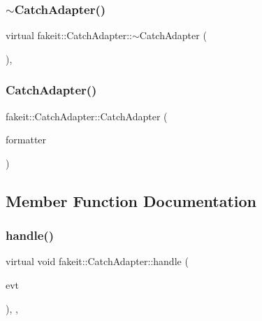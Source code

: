 \subsubsection{\texorpdfstring{$\sim$CatchAdapter()}{~CatchAdapter()}\hspace{0.1cm}{\footnotesize\ttfamily [2/2]}}
{\footnotesize\ttfamily virtual fakeit\+::\+Catch\+Adapter\+::$\sim$\+Catch\+Adapter (\begin{DoxyParamCaption}{ }\end{DoxyParamCaption})\hspace{0.3cm}{\ttfamily [virtual]}, {\ttfamily [default]}}

\mbox{\label{classfakeit_1_1CatchAdapter_acb482ad797e56b07cc0e019d1db0c323}} 
\subsubsection{\texorpdfstring{CatchAdapter()}{CatchAdapter()}\hspace{0.1cm}{\footnotesize\ttfamily [2/2]}}
{\footnotesize\ttfamily fakeit\+::\+Catch\+Adapter\+::\+Catch\+Adapter (\begin{DoxyParamCaption}\item[{\mbox{\hyperlink{structfakeit_1_1EventFormatter}{Event\+Formatter}} \&}]{formatter }\end{DoxyParamCaption})\hspace{0.3cm}{\ttfamily [inline]}}



\subsection{Member Function Documentation}
\mbox{\label{classfakeit_1_1CatchAdapter_aa6269004e30a0ecee8456f4a0e1681ff}} 
\subsubsection{\texorpdfstring{handle()}{handle()}\hspace{0.1cm}{\footnotesize\ttfamily [1/6]}}
{\footnotesize\ttfamily virtual void fakeit\+::\+Catch\+Adapter\+::handle (\begin{DoxyParamCaption}\item[{const \mbox{\hyperlink{structfakeit_1_1UnexpectedMethodCallEvent}{Unexpected\+Method\+Call\+Event}} \&}]{evt }\end{DoxyParamCaption})\hspace{0.3cm}{\ttfamily [inline]}, {\ttfamily [override]}, {\ttfamily [virtual]}}



